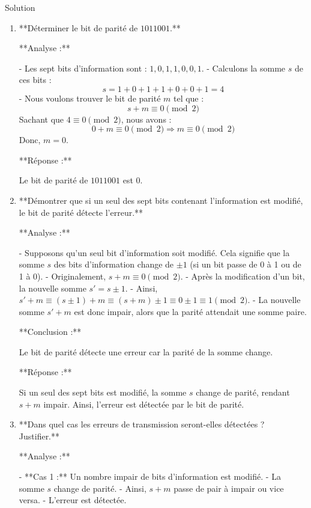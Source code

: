 \documentclass[a4paper,12pt]{article}
\begin{document}
\begin{solutionbox}{Solution}
\begin{enumerate}
    \item **Déterminer le bit de parité de \( 1011001 \).**
    
    **Analyse :**
    
    - Les sept bits d’information sont : \( 1, 0, 1, 1, 0, 0, 1 \).
    - Calculons la somme \( s \) de ces bits :
      \[
      s = 1 + 0 + 1 + 1 + 0 + 0 + 1 = 4
      \]
    - Nous voulons trouver le bit de parité \( m \) tel que :
      \[
      s + m \equiv 0 \pmod{2}
      \]
      Sachant que \( 4 \equiv 0 \pmod{2} \), nous avons :
      \[
      0 + m \equiv 0 \pmod{2} \Rightarrow m \equiv 0 \pmod{2}
      \]
      Donc, \( m = 0 \).
    
    **Réponse :**
    
    Le bit de parité de \( 1011001 \) est \( 0 \).
    
    \item **Démontrer que si un seul des sept bits contenant l’information est modifié, le bit de parité détecte l’erreur.**
    
    **Analyse :**
    
    - Supposons qu’un seul bit d’information soit modifié. Cela signifie que la somme \( s \) des bits d’information change de \( \pm 1 \) (si un bit passe de 0 à 1 ou de 1 à 0).
    - Originalement, \( s + m \equiv 0 \pmod{2} \).
    - Après la modification d’un bit, la nouvelle somme \( s' = s \pm 1 \).
    - Ainsi, \( s' + m \equiv (s \pm 1) + m \equiv (s + m) \pm 1 \equiv 0 \pm 1 \equiv 1 \pmod{2} \).
    - La nouvelle somme \( s' + m \) est donc impair, alors que la parité attendait une somme paire.
    
    **Conclusion :**
    
    Le bit de parité détecte une erreur car la parité de la somme change.
    
    **Réponse :**
    
    Si un seul des sept bits est modifié, la somme \( s \) change de parité, rendant \( s + m \) impair. Ainsi, l’erreur est détectée par le bit de parité.
    
    \item **Dans quel cas les erreurs de transmission seront-elles détectées ? Justifier.**
    
    **Analyse :**
    
    - **Cas 1 :** Un nombre impair de bits d’information est modifié.
      - La somme \( s \) change de parité.
      - Ainsi, \( s + m \) passe de pair à impair ou vice versa.
      - L’erreur est détectée.
    

\end{enumerate}
\end{solutionbox}
\end{document}
